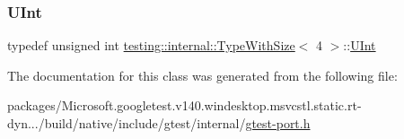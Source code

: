 \subsubsection{\texorpdfstring{UInt}{UInt}}
{\footnotesize\ttfamily typedef unsigned int \mbox{\hyperlink{classtesting_1_1internal_1_1_type_with_size}{testing\+::internal\+::\+Type\+With\+Size}}$<$ 4 $>$\+::\mbox{\hyperlink{classtesting_1_1internal_1_1_type_with_size_3_014_01_4_a7d559570f830bf35d095eeb94d98de58}{U\+Int}}}



The documentation for this class was generated from the following file\+:\begin{DoxyCompactItemize}
\item 
packages/\+Microsoft.\+googletest.\+v140.\+windesktop.\+msvcstl.\+static.\+rt-\/dyn.../build/native/include/gtest/internal/\mbox{\hyperlink{gtest-port_8h}{gtest-\/port.\+h}}\end{DoxyCompactItemize}
